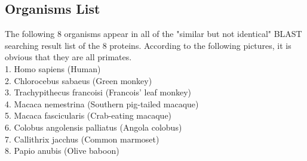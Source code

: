 \documentclass[a4paper, 12pt, one column]{article}
\begin{document}
\subsection{Organisms List}
The following 8 organisms appear in all of the "similar but not identical" BLAST searching result list of the 8 proteins. According to the following pictures, it is obvious that they are all primates.\\
1. Homo sapiens (Human) \\ 
2. Chlorocebus sabaeus (Green monkey) \\
3. Trachypithecus francoisi (Francois' leaf monkey) \\
4. Macaca nemestrina (Southern pig-tailed macaque) \\
5. Macaca fascicularis (Crab-eating macaque) \\
6. Colobus angolensis palliatus (Angola colobus) \\
7. Callithrix jacchus (Common marmoset) \\
8. Papio anubis (Olive baboon) \\
\end{document}
